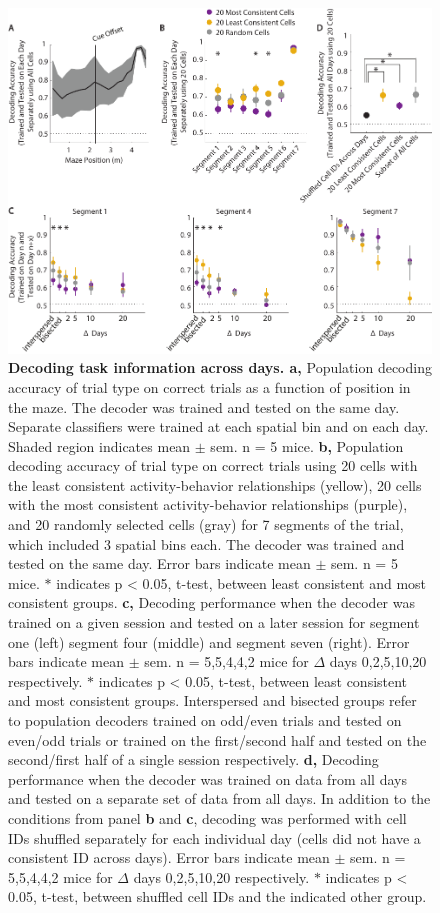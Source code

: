 \begin{figure}
\includegraphics[width=\textwidth]{figures/6_decoding_unstable_stable_7bins_small.pdf}
\caption[Decoding task information across days.]{\textbf{Decoding task information across days. a,} Population decoding accuracy of trial type on correct trials as a function of position in the maze. The decoder was trained and tested on the same day. Separate classifiers were trained at each spatial bin and on each day. Shaded region indicates mean $\pm$ sem. n = 5 mice.
%
\textbf{b,} Population decoding accuracy of trial type on correct trials using 20 cells with the least consistent activity-behavior relationships (yellow), 20 cells with the most consistent activity-behavior relationships (purple), and 20 randomly selected cells (gray) for 7 segments of the trial, which included 3 spatial bins each. The decoder was trained and tested on the same day. Error bars indicate mean $\pm$ sem. n = 5 mice. $*$ indicates p < 0.05, t-test, between least consistent and most consistent groups. 
%
\textbf{c,} Decoding performance when the decoder was trained on a given session and tested on a later session for segment one (left) segment four (middle) and segment seven (right). Error bars indicate mean $\pm$ sem. n = 5,5,4,4,2 mice for $\Delta$ days 0,2,5,10,20 respectively. $*$ indicates p < 0.05, t-test, between least consistent and most consistent groups. Interspersed and bisected groups refer to population decoders trained on odd/even trials and tested on even/odd trials or trained on the first/second half and tested on the second/first half of a single session respectively. 
%
\textbf{d,} Decoding performance when the decoder was trained on data from all days and tested on a separate set of data from all days. In addition to the conditions from panel \textbf{b} and \textbf{c}, decoding was performed with cell IDs shuffled separately for each individual day (cells did not have a consistent ID across days). Error bars indicate mean $\pm$ sem. n = 5,5,4,4,2 mice for $\Delta$ days 0,2,5,10,20 respectively.  $*$ indicates p < 0.05, t-test, between shuffled cell IDs and the indicated other group.
\label{fig:decoding}}
\end{figure}

